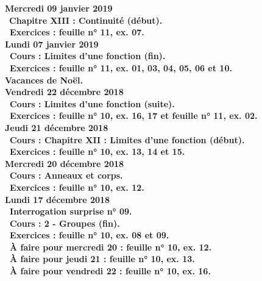 \documentclass[12pt,a4paper]{article}
\begin{document}
\noindent\textbf{Mercredi 09 janvier 2019} \\
\bu\ \bf Chapitre XIII \rm : Continuité (début).\\
\bu\ Exercices : feuille n° 11, ex. 07.\vspace{.4cm}\\
 
\noindent\textbf{Lundi 07 janvier 2019} \\
\bu\ Cours : Limites d'une fonction (fin).\\
\bu\ Exercices : feuille n° 11, ex. 01, 03, 04, 05, 06 et 10.\vspace{.4cm}\\

\noindent\textbf{\bf Vacances de Noël}.\vspace{.4cm}\\

\noindent\textbf{Vendredi 22 décembre 2018}\\ 
\bu\ Cours : Limites d'une fonction (suite).\\
\bu\ Exercices : feuille n° 10, ex. 16, 17 et feuille n° 11, ex. 02.\vspace{.4cm}\\
 
\noindent\textbf{Jeudi 21 décembre 2018}\\
\bu\ Cours : \bf Chapitre XII \rm : Limites d'une fonction (début).\\
\bu\ Exercices : feuille n° 10, ex. 13, 14 et 15.\vspace{.4cm}\\
 
\noindent\textbf{\bf Mercredi 20 décembre 2018}\\
\bu\ Cours : Anneaux et corps.\\ 
\bu\ Exercices : feuille n° 10, ex. 12.\vspace{.4cm}\\
 
\noindent\textbf{Lundi 17 décembre 2018}\\
\bu\ Interrogation surprise n° 09.\\
\bu\ Cours : 2 - Groupes (fin).\\ 
\bu\ Exercices : feuille n° 10, ex. 08 et 09.\\
\bu\ À faire pour mercredi 20 : feuille n° 10, ex. 12.\\
\bu\ À faire pour jeudi 21 : feuille n° 10, ex. 13.\\
\bu\ À faire pour vendredi 22 : feuille n° 10, ex. 16.\vspace{.4cm}\\ 
\end{document}
